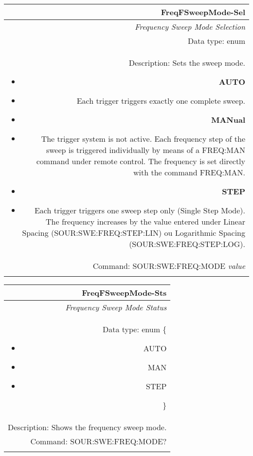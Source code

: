 \documentclass[openany]{article}
\begin{document}
		\begin{tabular}{N}
			\hline
			\bfseries FreqFSweepMode-Sel \\ \hline
			\emph{Frequency Sweep Mode Selection} \\
			Data type: enum \\
			Description: Sets the sweep mode.\begin{itemize}[noitemsep]
				\small
				\item[] \textbf{AUTO}
				\item[] Each trigger triggers exactly one complete sweep.
				\item[] \textbf{MANual}
				\item[] The trigger system is not active. Each frequency step of the sweep is triggered individually by means of a FREQ:MAN command under remote control. The frequency is set directly with the command FREQ:MAN.
				\item[] \textbf{STEP}
				\item[] Each trigger triggers one sweep step only (Single Step Mode). The frequency increases by the value entered under Linear Spacing (SOUR:SWE:FREQ:STEP:LIN) ou Logarithmic Spacing (SOUR:SWE:FREQ:STEP:LOG).
			\end{itemize} \\
			Command: SOUR:SWE:FREQ:MODE \emph{value} \\
			\\

		\end{tabular}


		\begin{tabular}{N}
			\hline
			\bfseries FreqFSweepMode-Sts \\ \hline
			\emph{Frequency Sweep Mode Status} \\
			Data type: enum \{\begin{itemize}[noitemsep]
				\small
				\item[] AUTO
				\item[] MAN
				\item[] STEP
			\end{itemize}\} \\
			Description: Shows the frequency sweep mode. \\
			Command: SOUR:SWE:FREQ:MODE? \\
			\\

		\end{tabular}
\end{document}
